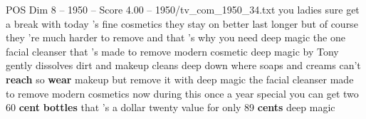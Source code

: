 \begin{textsample}{POS Dim 8 – 1950 – Score 4.00 – 1950/tv\_com\_1950\_34.txt}  \label{ex:f8_pos_004}
you ladies sure get a break with today 's fine cosmetics they stay on better last longer but of course they 're much harder to remove and that 's why you need deep magic the one facial cleanser that 's made to remove modern cosmetic deep magic by Tony gently dissolves dirt and makeup cleans deep down where soaps and creams can't \textbf{reach} so \textbf{wear} makeup but remove it with deep magic the facial cleanser made to remove modern cosmetics now during this once a year special you can get two 60 \textbf{cent} \textbf{bottles} that 's a dollar twenty value for only 89 \textbf{cents} deep magic

\end{textsample}

